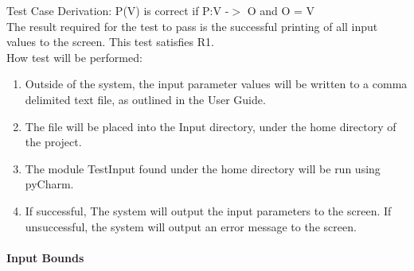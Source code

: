\documentclass[12pt, titlepage]{article}
\begin{document}
\begin{enumerate}
Test Case Derivation: P(V) is correct if P:V -$>$ O and O = V\\

The result required for the test to pass is the successful printing of all input values to the screen. This test satisfies R1.\\
					
How test will be performed: 

\begin{enumerate}
\item Outside of the system, the input parameter values will be written to a comma delimited text file, as outlined in the User Guide.
\item The file will be placed into the Input directory, under the home directory of the project.
\item The module TestInput found under the home directory will be run using pyCharm.
\item If successful, The system will output the input parameters to the screen. If unsuccessful, the system will output an error message to the screen.
\end{enumerate}
\end{enumerate}
			
\paragraph{Input Bounds}
\end{document}
